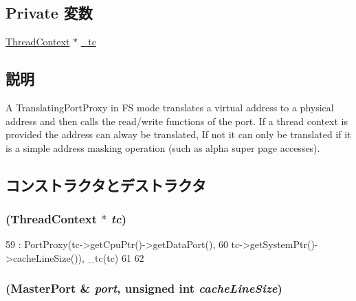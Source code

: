 \subsection*{Private 変数}
\begin{DoxyCompactItemize}
\item 
\hyperlink{classThreadContext}{ThreadContext} $\ast$ \hyperlink{classFSTranslatingPortProxy_a7d52dc2597c78fb5961715634ff972b5}{\_\-tc}
\end{DoxyCompactItemize}


\subsection{説明}
A TranslatingPortProxy in FS mode translates a virtual address to a physical address and then calls the read/write functions of the port. If a thread context is provided the address can alway be translated, If not it can only be translated if it is a simple address masking operation (such as alpha super page accesses). 

\subsection{コンストラクタとデストラクタ}
\hypertarget{classFSTranslatingPortProxy_aa5819e326f7ee4813d09fb5b5dd663ec}{
\subsubsection[{FSTranslatingPortProxy}]{ ({\bf ThreadContext} $\ast$ {\em tc})}}
\label{classFSTranslatingPortProxy_aa5819e326f7ee4813d09fb5b5dd663ec}



\begin{DoxyCode}
59     : PortProxy(tc->getCpuPtr()->getDataPort(),
60                 tc->getSystemPtr()->cacheLineSize()), _tc(tc)
61 {
62 }
\end{DoxyCode}
\hypertarget{classFSTranslatingPortProxy_a4f36ebf1b0ddd6cf75a1dab0672f0b0e}{
\subsubsection[{FSTranslatingPortProxy}]{ ({\bf MasterPort} \& {\em port}, \/  unsigned int {\em cacheLineSize})}}
\label{classFSTranslatingPortProxy_a4f36ebf1b0ddd6cf75a1dab0672f0b0e}



